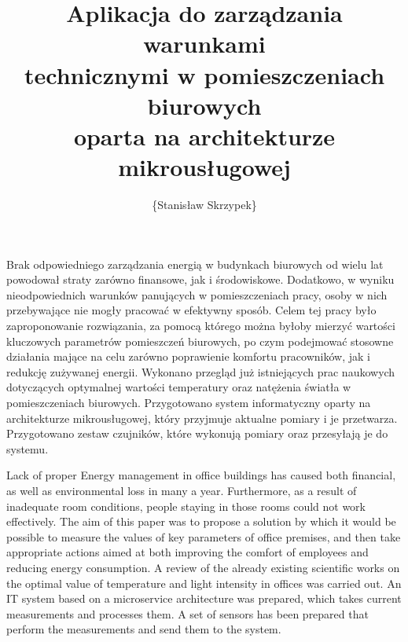 \documentclass[
    left=2.5cm,         %
    right=2.5cm,        %
    top=2.5cm,          %
    bottom=3cm,         %
    bindingoffset=6mm,  %
    nohyphenation=false %
]{eiti/eiti-thesis}
\begin{document}
\EngineerThesis %
{}
\title{
    Aplikacja do zarządzania warunkami \\
    technicznymi w pomieszczeniach biurowych \\
    oparta na architekturze mikrousługowej
}
\author{\{Stanisław Skrzypek\}}
\date{\the\year}
\maketitle

\cleardoublepage %
\streszczenie 
Brak odpowiedniego zarządzania energią w budynkach biurowych od wielu lat 
powodował straty zarówno finansowe, jak i środowiskowe. Dodatkowo, w wyniku 
nieodpowiednich warunków panujących w pomieszczeniach pracy, osoby w nich 
przebywające nie mogły pracować w efektywny sposób. Celem tej pracy było 
zaproponowanie rozwiązania, za pomocą którego można byłoby mierzyć wartości 
kluczowych parametrów pomieszczeń biurowych, po czym podejmować stosowne 
działania mające na celu zarówno poprawienie komfortu pracowników, jak i 
redukcję zużywanej energii. Wykonano przegląd już istniejących prac naukowych 
dotyczących optymalnej wartości temperatury oraz natężenia światła w 
pomieszczeniach biurowych. Przygotowano system informatyczny oparty na 
architekturze mikrousługowej, który przyjmuje aktualne pomiary i je przetwarza. 
Przygotowano zestaw czujników, które wykonują pomiary oraz przesyłają 
je do systemu. 

\newpage
\abstract
Lack of proper Energy management in office buildings has caused both 
financial, as well as environmental loss in many a year. Furthermore, as 
a result of inadequate room conditions, people staying in those rooms could 
not work effectively. The aim of this paper was to propose a solution by which 
it would be possible to measure the values of key parameters of office 
premises, and then take appropriate actions aimed at both improving the comfort 
of employees and reducing energy consumption. A review of the already existing 
scientific works on the optimal value of temperature and light intensity in 
offices was carried out. An IT system based on a microservice architecture was 
prepared, which takes current measurements and processes them. A set of sensors 
has been prepared that perform the measurements and send them to the system.
\end{document}

